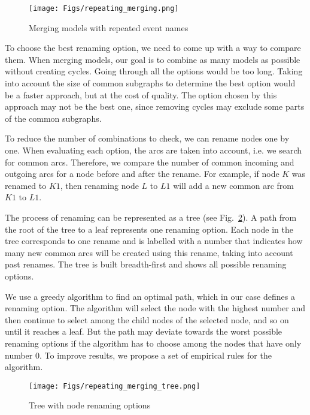 \documentclass[11pt]{article}
\theoremstyle{definition}
\begin{document}
\begin{figure}[htb]
    \centering
    \texttt{[image: Figs/repeating\_merging.png]}
    \caption{Merging models with repeated event names}
    \label{fig:repeating_merging}
\end{figure}

To choose the best renaming option, we need to come up with a way to compare them. When merging models, our goal is to combine as many models as possible without creating cycles. Going through all the options would be too long. Taking into account the size of common subgraphs to determine the best option would be a faster approach, but at the cost of quality. The option chosen by this approach may not be the best one, since removing cycles may exclude some parts of the common subgraphs.

To reduce the number of combinations to check, we can rename nodes one by one. When evaluating each option, the arcs are taken into account, i.e. we search for common arcs. 
Therefore, we compare the number of common incoming and outgoing arcs for a node before and after the rename.
For example, if node $K$ was renamed to $K1$, then renaming node $L$ to $L1$ will add a new common arc from $K1$ to $L1$.

The process of renaming can be represented as a tree (see Fig.~\ref{fig:repeating_merging_tree}). A path from the root of the tree to a leaf represents one renaming option. Each node in the tree corresponds to one rename and is labelled with a number that indicates how many new common arcs will be created using this rename, taking into account past renames. The tree is built breadth-first and shows all possible renaming options.

We use a greedy algorithm to find an optimal path, which in our case defines a renaming option. The algorithm will select the node with the highest number and then continue to select among the child nodes of the selected node, and so on until it reaches a leaf. But the path may deviate towards the worst possible renaming options if the algorithm has to choose among the nodes that have only number 0. To improve results, we propose a set of empirical rules for the algorithm.

\begin{figure}[htb]
    \centering
    \texttt{[image: Figs/repeating\_merging\_tree.png]}
    \caption{Tree with node renaming options}
    \label{fig:repeating_merging_tree}
\end{figure}
\end{document}
